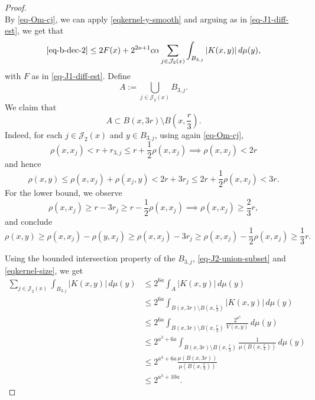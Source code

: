 \begin{proof}
\begin{equation}
\end{equation}
By \eqref{eq-Om-cj}, we can apply \eqref{eqkernel-y-smooth} and arguing as in \eqref{eq-J1-diff-est}, we get that
\begin{equation}
    \label{eq-J2-diff-est-2}
    \eqref{eq-b-dec-2} \le 2F(x) + 2^{2a+1}c\alpha \sum_{j\in\mathcal{J}_2(x)} \int_{B_{3,j}}  |K(x,y)|\,d\mu(y),
\end{equation}
with $F$ as in \eqref{eq-J1-diff-est}.
Define
\begin{equation*}
    A := \bigcup_{j \in \mathcal{J}_2(x)} B_{3,j}.
\end{equation*}
We claim that
\begin{equation}
    \label{eq-J2-union-subset}
    A\subset B(x,3r) \setminus B(x,\frac{r}{3}).
\end{equation}
Indeed, for each $j\in \mathcal{J}_2(x)$ and $y\in B_{3,j}$, using again \eqref{eq-Om-cj},
\begin{equation*}
    \rho(x,x_j) < r+r_{3,j} \le r + \frac{1}{2} \rho(x,x_j) \implies \rho(x,x_j) < 2r
\end{equation*}
and hence
\begin{equation*}
    \rho(x,y) \le \rho(x,x_j) + \rho(x_j,y) < 2r + 3r_j \le 2r + \frac{1}{2}\rho(x,x_j) < 3r.
\end{equation*}
For the lower bound, we observe
\begin{equation*}
    \rho(x,x_j) \ge r-3r_j \ge r - \frac{1}{2} \rho(x,x_j) \implies \rho(x,x_j) \ge \frac{2}{3}r,
\end{equation*}
and conclude
\begin{equation*}
    \rho(x,y) \ge \rho(x,x_j) - \rho(y,x_j) \ge \rho(x,x_j) - 3r_j \ge \rho(x,x_j) - \frac{1}{2}\rho(x,x_j) \ge \frac{1}{3} r.
\end{equation*}

Using the bounded intersection property of the $B_{3,j}$, \eqref{eq-J2-union-subset} and \eqref{eqkernel-size}, we get
\begin{align}
    \sum_{j\in\mathcal{J}_2(x)} \int_{B_{3,j}}  |K(x,y)|\,d\mu(y) &\le 2^{6a} \int_{A}  |K(x,y)|\,d\mu(y) \\
    &\le 2^{6a} \int_{B(x,3r) \setminus B(x,\frac{r}{3})}  |K(x,y)|\,d\mu(y) \\
    &\le 2^{6a} \int_{B(x,3r) \setminus B(x,\frac{r}{3})} \frac{2^{a^3}}{V(x,y)} \,d\mu(y) \\
    &\le 2^{a^3+6a} \int_{B(x,3r) \setminus B(x,\frac{r}{3})} \frac{1}{\mu(B(x,\frac{r}{3}))} \,d\mu(y) \\
    &\le 2^{a^3+6a} \frac{\mu(B(x,3r))}{\mu(B(x,\frac{r}{3}))} \\
    \label{eq-J2-diff-est-4}
    &\le 2^{a^3+10a}.
\end{align}


\end{proof}
